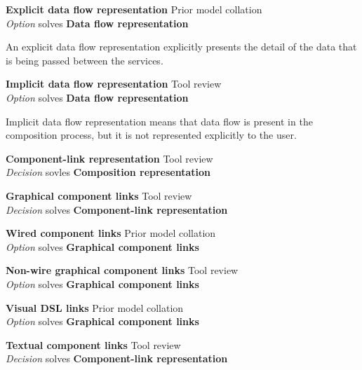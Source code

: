 \textbf{Explicit data flow representation} \hfill Prior model collation \cite{Grammel2010} \\ \emph{Option} \hfill solves \textbf{Data flow representation}

An explicit data flow representation explicitly presents the detail of the data that is being passed between the services.

\textbf{Implicit data flow representation} \hfill Tool review \\ \emph{Option} \hfill solves \textbf{Data flow representation}

Implicit data flow representation means that data flow is present in the composition process, but it is not represented explicitly to the user.

\textbf{Component-link representation} \hfill Tool review \\ \emph{Decision} \hfill sovles \textbf{Composition representation}



\textbf{Graphical component links} \hfill Tool review \\ \emph{Decision} \hfill solves \textbf{Component-link representation}

\textbf{Wired component links} \hfill Prior model collation \cite{Grammel2010,Aghaee2012,Minhas2012,Fischer2009,Pietschmann2010} \\ \emph{Option} \hfill solves \textbf{Graphical component links}


\textbf{Non-wire graphical component links} \hfill Tool review \\ \emph{Option} \hfill solves \textbf{Graphical component links}

\textbf{Visual DSL links} \hfill Prior model collation \cite{Grammel2010,Aghaee2012} \\ \emph{Option} \hfill solves \textbf{Graphical component links}

\textbf{Textual component links} \hfill Tool review \\ \emph{Decision} \hfill solves \textbf{Component-link representation}

